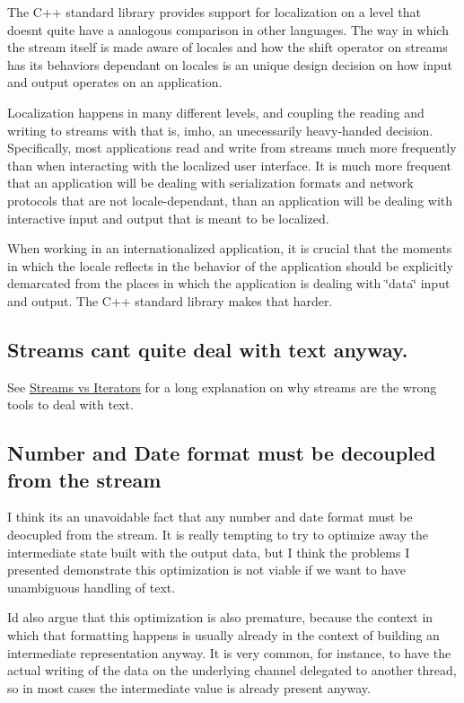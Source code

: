 The C++ standard library provides support for localization on a level that doesn\textquotesingle{}t quite have a analogous comparison in other languages. The way in which the stream itself is made aware of locales and how the shift operator on streams has its behaviors dependant on locales is an unique design decision on how input and output operates on an application.

Localization happens in many different levels, and coupling the reading and writing to streams with that is, imho, an unecessarily heavy-\/handed decision. Specifically, most applications read and write from streams much more frequently than when interacting with the localized user interface. It is much more frequent that an application will be dealing with serialization formats and network protocols that are not locale-\/dependant, than an application will be dealing with interactive input and output that is meant to be localized.

When working in an internationalized application, it is crucial that the moments in which the locale reflects in the behavior of the application should be explicitly demarcated from the places in which the application is dealing with \char`\"{}data\char`\"{} input and output. The C++ standard library makes that harder.

\subsection*{Streams can\textquotesingle{}t quite deal with text anyway.}

See \hyperlink{md__home_ruoso_devel_u5e_StreamVsIterators}{Streams vs Iterators} for a long explanation on why streams are the wrong tools to deal with text.

\subsection*{Number and Date format must be decoupled from the stream}

I think it\textquotesingle{}s an unavoidable fact that any number and date format must be deocupled from the stream. It is really tempting to try to optimize away the intermediate state built with the output data, but I think the problems I presented demonstrate this optimization is not viable if we want to have unambiguous handling of text.

I\textquotesingle{}d also argue that this optimization is also premature, because the context in which that formatting happens is usually already in the context of building an intermediate representation anyway. It is very common, for instance, to have the actual writing of the data on the underlying channel delegated to another thread, so in most cases the intermediate value is already present anyway.

